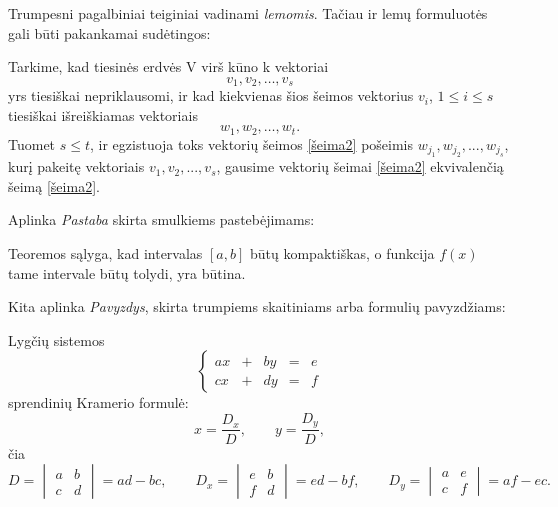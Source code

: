 \documentclass[]{VUMIFTemplateClass}
\begin{document}
\noindent Trumpesni pagalbiniai teiginiai vadinami \emph{lemomis}. Tačiau ir lemų formuluotės gali būti pakankamai sudėtingos:
\begin{lemma}\label{lem1}
    Tarkime, kad tiesinės erdvės V virš kūno k vektoriai
    \begin{equation}\label{šeima1}
        v_1, v_2, \dots, v_s
    \end{equation}
    yrs tiesiškai nepriklausomi, ir kad kiekvienas šios šeimos vektorius $v_i$, $1 \leq i \leq s$ tiesiškai išreiškiamas vektoriais
    \begin{equation}\label{šeima2}
        w_1, w_2, \dots, w_t.
    \end{equation}
    Tuomet $s \leq t$, ir egzistuoja toks vektorių šeimos \eqref{šeima2} pošeimis $w_{j_1}, w_{j_2} ,  . . . , w_{j_s}$, kurį pakeitę vektoriais $v_1, v_2, . . . , v_s$, gausime vektorių šeimai \eqref{šeima2} ekvivalenčią šeimą \eqref{šeima2}.
\end{lemma}

\noindent Aplinka \emph{Pastaba} skirta smulkiems pastebėjimams:

\begin{remark}
Teoremos sąlyga, kad intervalas $[a, b]$ būtų kompaktiškas, o funkcija $f(x)$ tame intervale būtų tolydi, yra būtina.
\end{remark}

\noindent Kita aplinka \emph{Pavyzdys}, skirta trumpiems skaitiniams arba formulių pavyzdžiams:

\begin{example}
Lygčių sistemos
\[
\left\{
\begin{array}{rclcl}
    ax & + & by & = & e\\
    cx & + & dy & = & f
\end{array}
\right.
\]
sprendinių Kramerio formulė:
\[
x = \frac{D_{x}}{D}, \qquad y = \frac{D_{y}}{D},\]
čia
\[
D=
\begin{vmatrix}
a & b\\
c & d    
\end{vmatrix}=ad-bc, \qquad
D_x=
\begin{vmatrix}
e & b\\
f & d    
\end{vmatrix}=ed-bf, \qquad
D_y=
\begin{vmatrix}
a & e\\
c & f    
\end{vmatrix}=af-ec.
\]
\end{example}
\end{document}
